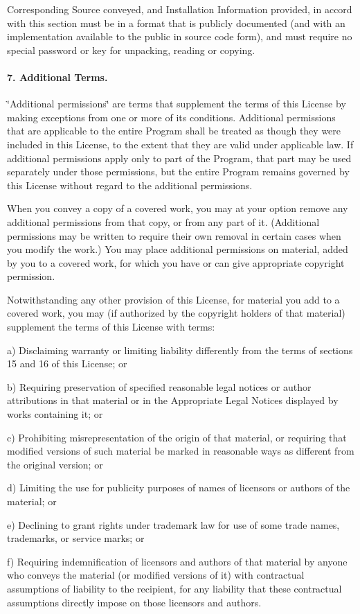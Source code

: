 Corresponding Source conveyed, and Installation Information provided, in accord with this section must be in a format that is publicly documented (and with an implementation available to the public in source code form), and must require no special password or key for unpacking, reading or copying.

\paragraph*{7. Additional Terms.}

\char`\"{}\+Additional permissions\char`\"{} are terms that supplement the terms of this License by making exceptions from one or more of its conditions. Additional permissions that are applicable to the entire Program shall be treated as though they were included in this License, to the extent that they are valid under applicable law. If additional permissions apply only to part of the Program, that part may be used separately under those permissions, but the entire Program remains governed by this License without regard to the additional permissions.

When you convey a copy of a covered work, you may at your option remove any additional permissions from that copy, or from any part of it. (Additional permissions may be written to require their own removal in certain cases when you modify the work.) You may place additional permissions on material, added by you to a covered work, for which you have or can give appropriate copyright permission.

Notwithstanding any other provision of this License, for material you add to a covered work, you may (if authorized by the copyright holders of that material) supplement the terms of this License with terms\+:


\begin{DoxyItemize}
\item a) Disclaiming warranty or limiting liability differently from the terms of sections 15 and 16 of this License; or
\item b) Requiring preservation of specified reasonable legal notices or author attributions in that material or in the Appropriate Legal Notices displayed by works containing it; or
\item c) Prohibiting misrepresentation of the origin of that material, or requiring that modified versions of such material be marked in reasonable ways as different from the original version; or
\item d) Limiting the use for publicity purposes of names of licensors or authors of the material; or
\item e) Declining to grant rights under trademark law for use of some trade names, trademarks, or service marks; or
\item f) Requiring indemnification of licensors and authors of that material by anyone who conveys the material (or modified versions of it) with contractual assumptions of liability to the recipient, for any liability that these contractual assumptions directly impose on those licensors and authors.
\end{DoxyItemize}

